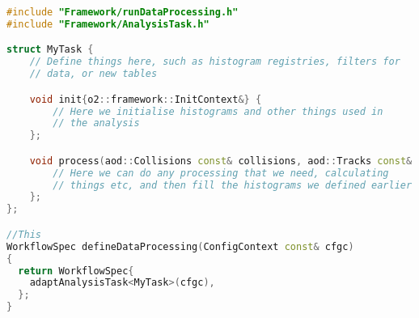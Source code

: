 \begin{lstlisting}[language=C++]
#include "Framework/runDataProcessing.h"
#include "Framework/AnalysisTask.h"

struct MyTask {
    // Define things here, such as histogram registries, filters for 
    // data, or new tables

    void init{o2::framework::InitContext&} {
        // Here we initialise histograms and other things used in 
        // the analysis
    };

    void process(aod::Collisions const& collisions, aod::Tracks const& tracks) {
        // Here we can do any processing that we need, calculating 
        // things etc, and then fill the histograms we defined earlier
    };
};

//This
WorkflowSpec defineDataProcessing(ConfigContext const& cfgc)
{
  return WorkflowSpec{
    adaptAnalysisTask<MyTask>(cfgc),
  };
}

\end{lstlisting}
